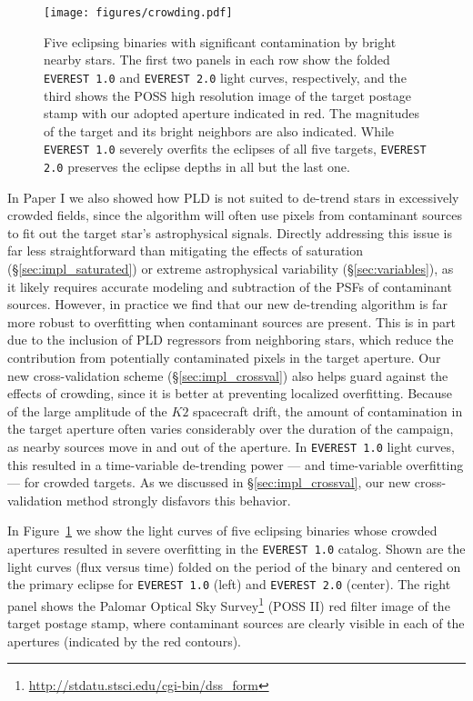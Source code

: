 \documentclass[]{aastex62}
\begin{document}
\begin{figure}[hbt]
  \begin{center}
      \texttt{[image: figures/crowding.pdf]}
      \vspace*{-0.5in}
       \caption{Five eclipsing binaries with significant contamination by bright nearby stars. The first
       two panels in each row show the folded \texttt{EVEREST 1.0} and \texttt{EVEREST 2.0} light curves, respectively,
       and the third shows the POSS high resolution image of
       the target postage stamp with our adopted aperture indicated in red. The magnitudes of the target
       and its bright neighbors are also indicated. While \texttt{EVEREST 1.0} severely overfits the eclipses of
       all five targets, \texttt{EVEREST 2.0} preserves the eclipse depths in all but the last one.}
     \label{fig:crowding}
  \end{center}
\end{figure}

In Paper I we also showed how PLD is not suited to de-trend stars in excessively crowded fields,
since the algorithm will often use pixels from contaminant sources to fit out the target star's astrophysical
signals. Directly addressing this issue is far less straightforward than mitigating the effects of saturation (\S\ref{sec:impl_saturated})
or extreme astrophysical variability (\S\ref{sec:variables}), as it likely requires accurate modeling and
subtraction of the PSFs of contaminant sources. However, in practice we find that our new de-trending
algorithm is far more robust to overfitting when contaminant sources are present. This is in part
due to the inclusion of PLD regressors from neighboring stars, which reduce the contribution from
potentially contaminated pixels in the target aperture. Our new cross-validation scheme (\S\ref{sec:impl_crossval})
also helps guard against the effects of crowding, since it is better at preventing localized
overfitting. Because of the large amplitude of the $K2$ spacecraft drift, the amount of contamination
in the target aperture often varies considerably over the duration of the campaign, as nearby sources
move in and out of the aperture. In \texttt{EVEREST 1.0} light curves, this resulted in a time-variable
de-trending power --- and time-variable overfitting --- for crowded targets. As we discussed in \S\ref{sec:impl_crossval},
our new cross-validation method strongly disfavors this behavior.

In Figure~\ref{fig:crowding} we show the light curves of five eclipsing binaries whose crowded apertures
resulted in severe overfitting in the \texttt{EVEREST 1.0} catalog. Shown are the light curves (flux versus time) folded
on the period of the binary and centered on the primary eclipse for \texttt{EVEREST 1.0} (left) and \texttt{EVEREST 2.0} (center).
The right panel shows the Palomar Optical Sky Survey\footnote{\url{http://stdatu.stsci.edu/cgi-bin/dss_form}} (POSS II)
red filter image of the target postage stamp, where contaminant sources are clearly visible in each of the apertures (indicated
by the red contours).
\end{document}
